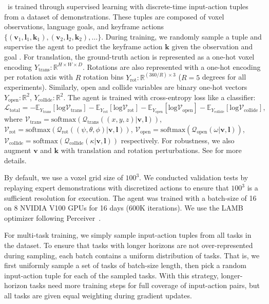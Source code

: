 \model~is trained through supervised learning with discrete-time input-action tuples from a dataset of demonstrations. These tuples are composed of voxel observations, language goals, and keyframe actions $\{(\mathbf{v}_{1}, \mathbf{l}_{1}, \mathbf{k}_{1}), (\mathbf{v}_{2}, \mathbf{l}_{2}, \mathbf{k}_{2}), \ldots\}$. During training, we randomly sample a tuple and supervise the agent to predict the keyframe action $\mathbf{k}$ given the observation and goal . For translation, the ground-truth action is represented as a one-hot voxel encoding $Y_{\textrm{trans}} : \mathbb{R}^{H \times W \times D}$. Rotations are also represented with a one-hot encoding per rotation axis with $R$ rotation bins $Y_{\textrm{rot}} : \mathbb{R}^{(360/R) \times 3}$  ($R=5$ degrees for all experiments). Similarly, open and collide variables are binary one-hot vectors $Y_{\textrm{open}} : \mathbb{R}^{2}$, $Y_{\textrm{collide}} : \mathbb{R}^{2}$. The agent is trained with cross-entropy loss like a  classifier: 
\begin{equation*}
    \mathcal{L}_{\textrm{total}} = - \mathbb{E}_{Y_{\textrm{trans}}}[\textrm{log} \mathcal{V}_{\textrm{trans}}] - \mathbb{E}_{Y_{\textrm{rot}}}[\textrm{log} \mathcal{V}_{\textrm{rot}}] - \mathbb{E}_{Y_{\textrm{open}}}[\textrm{log} \mathcal{V}_{\textrm{open}}] -
    \mathbb{E}_{Y_{\textrm{collide}}}[\textrm{log} \mathcal{V}_{\textrm{collide}}],
\end{equation*}
where $\mathcal{V}_{\textrm{trans}} = \textrm{softmax}(\mathcal{Q}_{\textrm{trans}}((x,y,z) | \mathbf{v}, \mathbf{l}))$, $\mathcal{V}_{\textrm{rot}} = \textrm{softmax}(\mathcal{Q}_{\textrm{rot}}((\psi, \theta, \phi) | \mathbf{v}, \mathbf{l}))$, $\mathcal{V}_{\textrm{open}} = \textrm{softmax}(\mathcal{Q}_{\textrm{open}}(\omega | \mathbf{v}, \mathbf{l}))$, $\mathcal{V}_{\textrm{collide}} = \textrm{softmax}(\mathcal{Q}_{\textrm{collide}}(\kappa | \mathbf{v}, \mathbf{l}))$ respectively. For robustness, we also augment $\mathbf{v}$ and $\mathbf{k}$ with translation and rotation perturbations. See  for more details.

By default, we use a voxel grid size of $100^3$. We conducted validation tests by replaying expert demonstrations with discretized actions to ensure that $100^3$ is a sufficient resolution for execution. The agent was trained with a batch-size of 16 on 8 NVIDIA V100 GPUs for 16 days (600K iterations). We use the LAMB~\citep{you2019large} optimizer following Perceiver~\citep{jaegle2021perceiver}.

For multi-task training, we simply sample input-action tuples from all tasks in the dataset. To ensure that tasks with longer horizons are not over-represented during sampling, each batch contains a uniform distribution of tasks. That is, we first uniformly sample a set of tasks of batch-size length, then pick a random input-action tuple for each of the sampled tasks. With this strategy, longer-horizon tasks need more training steps for full coverage of input-action pairs, but all tasks are given equal weighting during gradient updates.

